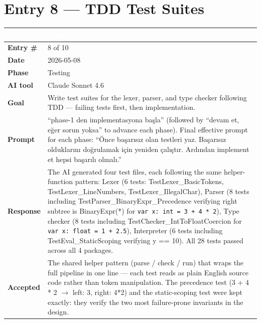 \documentclass[a4paper,10pt]{article}
\begin{document}
\newpage

\section{Entry 8 --- TDD Test Suites}

\begin{tabular}{|
    >{\bfseries}m{3.5cm}|
    m{10cm}|
}
\hline
\rowcolor{headerblue}
\textcolor{white}{Field} & \textcolor{white}{\textbf{Content}} \\
\hline
\rowcolor{white}
Entry \#        & 8 of 10 \\
\hline
\rowcolor{altrow}
Date            & 2026-05-08 \\
\hline
\rowcolor{white}
Phase           & Testing \\
\hline
\rowcolor{altrow}
AI tool         & Claude Sonnet 4.6  \\
\hline
\rowcolor{white}
Goal            & Write test suites for the lexer, parser, and type checker following TDD --- failing tests first, then implementation. \\
\hline
\rowcolor{altrow}
Prompt          & ``phase-1 den implementasyona başla'' (followed by ``devam et, eğer sorun yoksa'' to advance each phase). Final effective prompt for each phase: ``Önce başarısız olan testleri yaz. Başarısız olduklarını doğrulamak için yeniden çalıştır. Ardından implement et hepsi başarılı olmalı.'' \\
\hline
\rowcolor{white}
Response & The AI generated four test files, each following the same helper-function pattern: Lexer (6 tests: TestLexer\_BasicTokens, TestLexer\_LineNumbers, TestLexer\_IllegalChar), Parser (8 tests including TestParser\_BinaryExpr\_Precedence verifying right subtree is BinaryExpr(*) for \texttt{var x: int = 3 + 4 * 2}), Type checker (8 tests including TestChecker\_IntToFloatCoercion for \texttt{var x: float = 1 + 2.5}), Interpreter (6 tests including TestEval\_StaticScoping verifying y == 10). All 28 tests passed across all 4 packages. \\
\hline
\rowcolor{altrow}
Accepted        & The shared helper pattern (parse / check / run) that wraps the full pipeline in one line --- each test reads as plain English source code rather than token manipulation. The precedence test (3 + 4 * 2 $\rightarrow$ left: 3, right: 4*2) and the static-scoping test were kept exactly: they verify the two most failure-prone invariants in the design. \\

\end{tabular}
\end{document}

